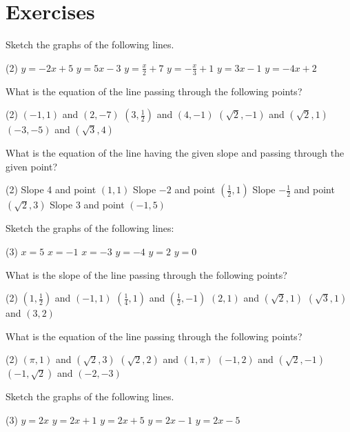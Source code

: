 \documentclass[12pt]{book} %
\begin{document}
\section*{Exercises}

\begin{ExerciseList}
\Exercise Sketch the graphs of the following lines.
\begin{tasks}(2)
\task[(1a)] $y=-2x+5$
\task[(1b)] $y=5x-3$
\task[(2a)] $y=\frac{x}{2}+7$
\task[(2b)] $y=-\frac{x}{3}+1$
\task[(3a)] $y=3x-1$
\task[(3b)] $y=-4x+2$
\end{tasks}

\Exercise What is the equation of the line passing through the following points?
\begin{tasks}(2)
\task[(4a)] $(-1,1)$ and $(2,-7)$
\task[(4b)] $(3,\frac12)$ and $(4,-1)$
\task[(5a)] $(\sqrt{2},-1)$ and $(\sqrt{2},1)$
\task[(5b)] $(-3,-5)$ and $(\sqrt{3},4)$
\end{tasks}

\Exercise What is the equation of the line having the given slope and passing through the given point?
\begin{tasks}(2)
\task[(6)] Slope 4 and point $(1,1)$
\task[(7)] Slope $-2$ and point $(\frac12,1)$
\task[(8)] Slope $-\frac12$ and point $(\sqrt{2},3)$
\task[(9)] Slope 3 and point $(-1,5)$
\end{tasks}

\Exercise Sketch the graphs of the following lines:
\begin{tasks}(3)
\task[(10)] $x=5$
\task[(11)] $x=-1$
\task[(12)] $x=-3$
\task[(13)] $y=-4$
\task[(14)] $y=2$
\task[(15)] $y=0$
\end{tasks}

\Exercise What is the slope of the line passing through the following points?
\begin{tasks}(2)
\task[(16)] $(1,\frac12)$ and $(-1,1)$
\task[(17)] $(\frac14,1)$ and $(\frac12,-1)$
\task[(18)] $(2,1)$ and $(\sqrt{2},1)$
\task[(19)] $(\sqrt{3},1)$ and $(3,2)$
\end{tasks}

\Exercise What is the equation of the line passing through the following points?
\begin{tasks}(2)
\task[(20)] $(\pi,1)$ and $(\sqrt{2},3)$
\task[(21)] $(\sqrt{2},2)$ and $(1,\pi)$
\task[(22)] $(-1,2)$ and $(\sqrt{2},-1)$
\task[(23)] $(-1,\sqrt{2})$ and $(-2,-3)$
\end{tasks}

\Exercise Sketch the graphs of the following lines.
\begin{tasks}(3)
\task[(24a)] $y=2x$
\task[(24b)] $y=2x+1$
\task[(24c)] $y=2x+5$
\task[(24d)] $y=2x-1$
\task[(24e)] $y=2x-5$
\end{tasks}
\end{ExerciseList}
\end{document}
